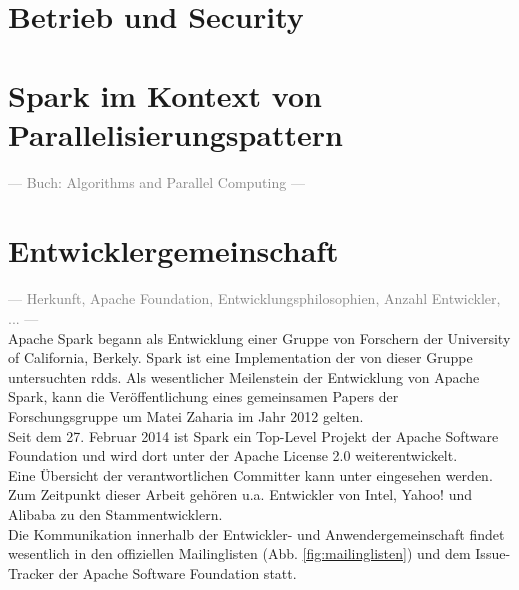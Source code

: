 \section{Betrieb und Security}

\section{Spark im Kontext von Parallelisierungspattern}
\textcolor{gray}{--- Buch: Algorithms and Parallel Computing ---}\\

\section{Entwicklergemeinschaft}
\textcolor{gray}{--- Herkunft, Apache Foundation, Entwicklungsphilosophien, Anzahl Entwickler, ... ---}\\

Apache Spark begann als Entwicklung einer Gruppe von Forschern der University of California, Berkely. Spark ist eine Implementation der von dieser Gruppe untersuchten \glspl{rdd}\cite{Mat12}. Als wesentlicher Meilenstein der Entwicklung von Apache Spark, kann die Veröffentlichung eines gemeinsamen Papers der Forschungsgruppe um Matei Zaharia im Jahr 2012 gelten.\\

Seit dem 27. Februar 2014\cite{apacheblog} ist Spark ein Top-Level Projekt der Apache Software Foundation\cite{apache} und wird dort unter der Apache License 2.0\cite{apachelic} weiterentwickelt.\\

Eine Übersicht der verantwortlichen Committer kann unter \cite{committer} eingesehen werden.
Zum Zeitpunkt dieser Arbeit gehören u.a. Entwickler von Intel, Yahoo! und Alibaba zu den Stammentwicklern.\\

Die Kommunikation innerhalb der Entwickler- und Anwendergemeinschaft findet wesentlich in den offiziellen Mailinglisten (Abb. \ref{fig:mailinglisten}) und dem Issue-Tracker\cite{issuetracker} der Apache Software Foundation statt.

